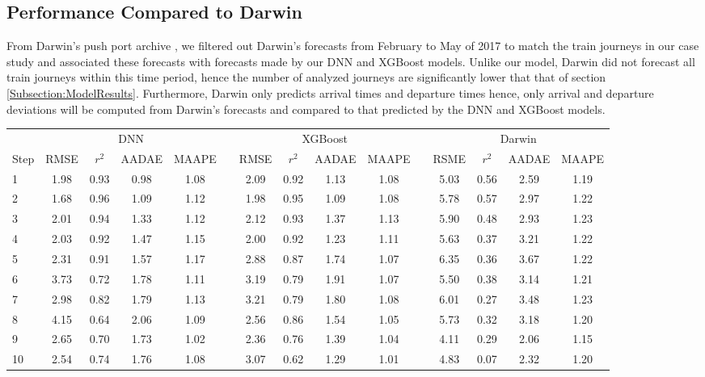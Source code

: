 \documentclass[]{interact}
\theoremstyle{plain}%
\theoremstyle{definition}
\theoremstyle{remark}
\begin{document}
\subsection{Performance Compared to Darwin}
 From Darwin's push port archive \citep{PET17}, we filtered out Darwin's forecasts from February to May of 2017 to match the train journeys in our case study and associated these forecasts with forecasts made by our DNN and XGBoost models. Unlike our model, Darwin did not forecast all train journeys within this time period, hence the number of analyzed journeys are significantly lower that that of section \ref{Subsection:ModelResults}. Furthermore, Darwin only predicts arrival times and departure times hence, only arrival and departure deviations will be computed from Darwin's forecasts and compared to that predicted by the DNN and XGBoost models.
\begin{table}[H]
{\begin{tabular}{lcccccccccccccc} \toprule
&  \multicolumn{4}{c}{DNN}  & \multicolumn{1}{c}{\quad} &  \multicolumn{4}{c}{XGBoost} & \multicolumn{1}{c}{\quad} &  \multicolumn{4}{c}{Darwin}\\ \cmidrule{2-15}
Step  &  RMSE  &  $r^2$  &  AADAE  & MAAPE & \quad &  RMSE  &  $r^2$  &  AADAE & MAAPE & \quad & RSME &  $r^2$  &  AADAE & MAAPE\\ \midrule
1 &  1.98 & 0.93 & 0.98 & 1.08 & \quad & 2.09 & 0.92 & 1.13 & 1.08 & \quad & 5.03 & 0.56 & 2.59 & 1.19\\
2 &  1.68 & 0.96 & 1.09 & 1.12 & \quad & 1.98 & 0.95 & 1.09 & 1.08 & \quad & 5.78 & 0.57 & 2.97 & 1.22\\
3 &  2.01 & 0.94 & 1.33 & 1.12 & \quad & 2.12 & 0.93 & 1.37 & 1.13 & \quad & 5.90 & 0.48 & 2.93 & 1.23\\
4 &  2.03 & 0.92 & 1.47 & 1.15 & \quad & 2.00 & 0.92 & 1.23 & 1.11 & \quad & 5.63 & 0.37 & 3.21 & 1.22\\
5 &  2.31 & 0.91 & 1.57 & 1.17 & \quad & 2.88 & 0.87 & 1.74 & 1.07 & \quad & 6.35 & 0.36 & 3.67 & 1.22\\
6 &  3.73 & 0.72 & 1.78 & 1.11 & \quad & 3.19 & 0.79 & 1.91 & 1.07 & \quad & 5.50 & 0.38 & 3.14 & 1.21\\
7 &  2.98 & 0.82 & 1.79 & 1.13 & \quad & 3.21 & 0.79 & 1.80 & 1.08 & \quad & 6.01 & 0.27 & 3.48 & 1.23\\
8 &  4.15 & 0.64 & 2.06 & 1.09 & \quad & 2.56 & 0.86 & 1.54 & 1.05 & \quad & 5.73 & 0.32 & 3.18 & 1.20\\
9 &  2.65 & 0.70 & 1.73 & 1.02 & \quad & 2.36 & 0.76 & 1.39 & 1.04 & \quad & 4.11 & 0.29 & 2.06 & 1.15\\
10 &  2.54 & 0.74 & 1.76 & 1.08 & \quad & 3.07 & 0.62 & 1.29 & 1.01 & \quad & 4.83 & 0.07 & 2.32 & 1.20\\
 \bottomrule
\end{tabular}}
\label{ArrivalDeviationPredictionVSDarwin}
\end{table}
\end{document}
